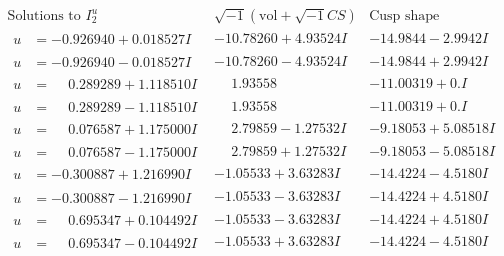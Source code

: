 \documentclass[1p]{elsarticle_modified}
\theoremstyle{definition}
\newcommand{\I}{\sqrt{-1}}
\begin{document}
$$\begin{array}{c|c|c}  
\text{Solutions to }I^u_{2}& \I (\text{vol} + \sqrt{-1}CS) & \text{Cusp shape}\\
 \hline 
\begin{aligned}
u &= -0.926940 + 0.018527 I\end{aligned}
 & -10.78260 + 4.93524 I & -14.9844 - 2.9942 I \\ \hline\begin{aligned}
u &= -0.926940 - 0.018527 I\end{aligned}
 & -10.78260 - 4.93524 I & -14.9844 + 2.9942 I \\ \hline\begin{aligned}
u &= \phantom{-}0.289289 + 1.118510 I\end{aligned}
 & \phantom{-}1.93558\phantom{ +0.000000I} & -11.00319 + 0. I\phantom{ +0.000000I} \\ \hline\begin{aligned}
u &= \phantom{-}0.289289 - 1.118510 I\end{aligned}
 & \phantom{-}1.93558\phantom{ +0.000000I} & -11.00319 + 0. I\phantom{ +0.000000I} \\ \hline\begin{aligned}
u &= \phantom{-}0.076587 + 1.175000 I\end{aligned}
 & \phantom{-}2.79859 - 1.27532 I & -9.18053 + 5.08518 I \\ \hline\begin{aligned}
u &= \phantom{-}0.076587 - 1.175000 I\end{aligned}
 & \phantom{-}2.79859 + 1.27532 I & -9.18053 - 5.08518 I \\ \hline\begin{aligned}
u &= -0.300887 + 1.216990 I\end{aligned}
 & -1.05533 + 3.63283 I & -14.4224 - 4.5180 I \\ \hline\begin{aligned}
u &= -0.300887 - 1.216990 I\end{aligned}
 & -1.05533 - 3.63283 I & -14.4224 + 4.5180 I \\ \hline\begin{aligned}
u &= \phantom{-}0.695347 + 0.104492 I\end{aligned}
 & -1.05533 - 3.63283 I & -14.4224 + 4.5180 I \\ \hline\begin{aligned}
u &= \phantom{-}0.695347 - 0.104492 I\end{aligned}
 & -1.05533 + 3.63283 I & -14.4224 - 4.5180 I \\ \hline\begin{aligned}

\end{aligned}
\end{array}$$
\end{document}
